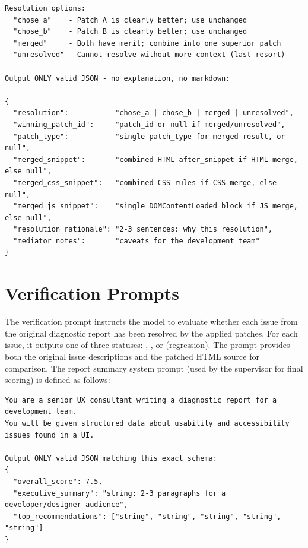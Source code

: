 \begin{itemize}
\begin{lstlisting}[caption={Conflict Mediator system prompt excerpt (from \filepath{prompts/recommender\_prompts.py}).}, label={lst:mediator-prompt}]
Resolution options:
  "chose_a"    - Patch A is clearly better; use unchanged
  "chose_b"    - Patch B is clearly better; use unchanged
  "merged"     - Both have merit; combine into one superior patch
  "unresolved" - Cannot resolve without more context (last resort)

Output ONLY valid JSON - no explanation, no markdown:

{
  "resolution":           "chose_a | chose_b | merged | unresolved",
  "winning_patch_id":     "patch_id or null if merged/unresolved",
  "patch_type":           "single patch_type for merged result, or null",
  "merged_snippet":       "combined HTML after_snippet if HTML merge, else null",
  "merged_css_snippet":   "combined CSS rules if CSS merge, else null",
  "merged_js_snippet":    "single DOMContentLoaded block if JS merge, else null",
  "resolution_rationale": "2-3 sentences: why this resolution",
  "mediator_notes":       "caveats for the development team"
}
\end{lstlisting}


\section{Verification Prompts}
\label{app:verification-prompts}

The verification prompt instructs the model to evaluate whether each issue from the original diagnostic report has been resolved by the applied patches. For each issue, it outputs one of three statuses: , , or  (regression). The prompt provides both the original issue descriptions and the patched HTML source for comparison. The report summary system prompt (used by the supervisor for final scoring) is defined as follows:

\begin{lstlisting}[caption={Supervisor Report Summary / Verification system prompt excerpt (from \filepath{prompts/supervisor\_prompts.py}).}, label={lst:verification-prompt}]
You are a senior UX consultant writing a diagnostic report for a development team.
You will be given structured data about usability and accessibility issues found in a UI.

Output ONLY valid JSON matching this exact schema:
{
  "overall_score": 7.5,
  "executive_summary": "string: 2-3 paragraphs for a developer/designer audience",
  "top_recommendations": ["string", "string", "string", "string", "string"]
}


\end{lstlisting}
\end{itemize}
